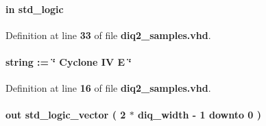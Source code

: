 \paragraph[{data\+\_\+src}]{ {\bfseries \textcolor{keywordflow}{in}\textcolor{vhdlchar}{ }} {\bfseries \textcolor{comment}{std\+\_\+logic}\textcolor{vhdlchar}{ }} \hspace{0.3cm}{\ttfamily [Port]}}\label{classdiq2__samples_a38f58ae7967c4b5c8a5a4dac272b8515}


Definition at line {\bf 33} of file {\bf diq2\+\_\+samples.\+vhd}.

\paragraph[{dev\+\_\+family}]{ {\bfseries \textcolor{vhdlchar}{ }} {\bfseries \textcolor{comment}{string}\textcolor{vhdlchar}{ }\textcolor{vhdlchar}{ }\textcolor{vhdlchar}{\+:}\textcolor{vhdlchar}{=}\textcolor{vhdlchar}{ }\textcolor{vhdlchar}{ }\textcolor{vhdlchar}{ }\textcolor{vhdlchar}{ }\textcolor{keyword}{\char`\"{} Cyclone I\+V E \char`\"{}}\textcolor{vhdlchar}{ }} \hspace{0.3cm}{\ttfamily [Generic]}}\label{classdiq2__samples_a1314572919959082d23e5f98e64a0ce2}


Definition at line {\bf 16} of file {\bf diq2\+\_\+samples.\+vhd}.

\paragraph[{diq}]{ {\bfseries \textcolor{keywordflow}{out}\textcolor{vhdlchar}{ }} {\bfseries \textcolor{comment}{std\+\_\+logic\+\_\+vector}\textcolor{vhdlchar}{ }\textcolor{vhdlchar}{(}\textcolor{vhdlchar}{ }\textcolor{vhdlchar}{ } \textcolor{vhdldigit}{2} \textcolor{vhdlchar}{$\ast$}\textcolor{vhdlchar}{ }\textcolor{vhdlchar}{ }\textcolor{vhdlchar}{ }{\bfseries {\bf diq\+\_\+width}} \textcolor{vhdlchar}{-\/}\textcolor{vhdlchar}{ } \textcolor{vhdldigit}{1} \textcolor{vhdlchar}{ }\textcolor{keywordflow}{downto}\textcolor{vhdlchar}{ }\textcolor{vhdlchar}{ } \textcolor{vhdldigit}{0} \textcolor{vhdlchar}{ }\textcolor{vhdlchar}{)}\textcolor{vhdlchar}{ }} \hspace{0.3cm}{\ttfamily [Port]}}\label{classdiq2__samples_a9909870cc2f7051aef3c45a179d376ed}


